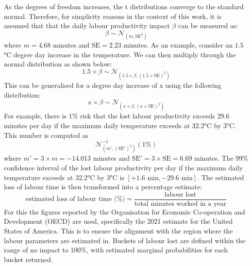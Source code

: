 \documentclass[a4paper,11pt]{extarticle} %
\theoremstyle{definition}
\begin{document}
As the degrees of freedom increases, the t distributions converge to the standard normal. Therefore, for simplicity reasons in the context of this work, it is assumed that that the daily labour productivity impact $\beta$ can be measured as:
\begin{equation}
    \label{Eq:uncertainty1}
        \beta \sim \mathcal{N}_{\left(m,\text{SE}^{2}\right)}
\end{equation}
where $m = 4.68$ minutes and $\text{SE}=2.23$ minutes. As an example, consider an $1.5$°C degree day increase in the temperature. We can then multiply through the normal distribution as shown below:
\begin{equation}
    \label{Eq:uncertainty2}
    1.5 \times \beta \sim \mathcal{N}_{\left(1.5 \times \beta,(1.5 \times \text{SE})^{2}\right)}
\end{equation}
This can be generalised for a degree day increase of x using the following distribution:
\begin{equation}
    \label{Eq:uncertainty3}
    x \times \beta \sim \mathcal{N}_{\left(x \times \beta,\left(x\times\text{SE}\right)^{2}\right)}
\end{equation}
For example, there is 1\% risk that the lost labour productivity exceeds $29.6$ minutes per day if the maximum daily temperature exceeds at $32.2$°C by $3$°C. This number is computed as
$$
\mathcal{N}^{-1}_{\left(m',\left(\text{SE}'\right)^2\right)}\left(1\%\right)
$$
where $m'= 3 \times m = -14.013$ minutes and $\text{SE}'= 3 \times \text{SE} = 6.69$ minutes. The $99\%$ confidence interval of the lost labour productivity per day if the maximum daily temperature exceeds at $32.2$°C by $3$°C is $\left[+1.6\text{ min}, -29.6\text{ min}\right]$.
The estimated loss of labour time is then transformed into a percentage estimate:
\begin{equation}
    \label{Eq:uncertainty3}
    \text{estimated loss of labour time (\%)}=  \frac{\text{labour lost}}{\text{total minutes worked in a year}}
\end{equation}
For this the figures reported by the Organisation for Economic Co-operation and Development (OECD) are used, specifically the 2021 estimate for the United States of America. This is to ensure the alignment with the region where the labour parameters are estimated in. Buckets of labour lost are defined within the range of no impact to 100\%, with estimated marginal probabilities for each bucket returned.
\end{document}
